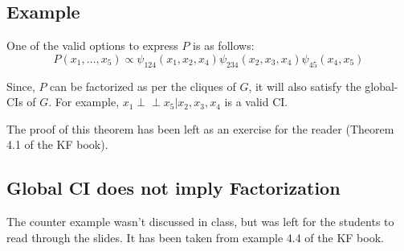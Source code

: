 \documentclass[a4paper]{article}
\begin{document}
\subsection{Example}

\begin{minipage}{0.55\textwidth} 
    One of the valid options to express $P$ is as follows:
    \[P(x_1, \dots, x_5) \propto \psi_{124}(x_1, x_2, x_4)\psi_{234}(x_2, x_3, x_4)\psi_{45}(x_4, x_5)\]

    Since, $P$ can be factorized as per the cliques of $G$, it will also satisfy the global-CIs of $G$. For example, $x_1 \perp\!\!\!\perp x_5 | x_2, x_3, x_4$ is a valid CI.
\end{minipage}
\hfill 
\begin{minipage}{0.40\textwidth} 
\end{minipage}

The proof of this theorem has been left as an exercise for the reader (Theorem 4.1 of the KF book).

\subsection{Global CI does not imply Factorization}
The counter example wasn't discussed in class, but was left for the students to read through the slides. It has been taken from example 4.4 of the KF book.
\end{document}
